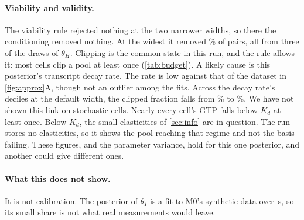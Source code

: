 \paragraph{Viability and validity.} The viability rule rejected nothing at the two
narrower widths, so there the conditioning removed nothing. At the widest it removed
\% of pairs, all from three of the  draws of
$\theta_H$. Clipping is the common state in this run, and the rule allows it: most cells
clip a pool at least once (\cref{tab:budget}). A likely cause is this posterior's
transcript decay rate. The rate is low against that of the dataset in \cref{fig:approx}A, though not an
outlier among the  fits. Across the decay rate's deciles at the default
width, the clipped fraction falls from \% to
\%. We have not shown this link on stochastic cells. Nearly every
cell's GTP falls below $K_d$ at least once. Below $K_d$, the small elasticities of
\cref{sec:info} are in question. The run stores no elasticities, so it shows the pool
reaching that regime and not the basis failing. These figures, and the parameter
variance, hold for this one posterior, and another could give different ones.

\paragraph{What this does not show.} It is not calibration. The posterior of $\theta_I$
is a fit to M0's synthetic data over \,s, so its small share is not
what real measurements would leave.

